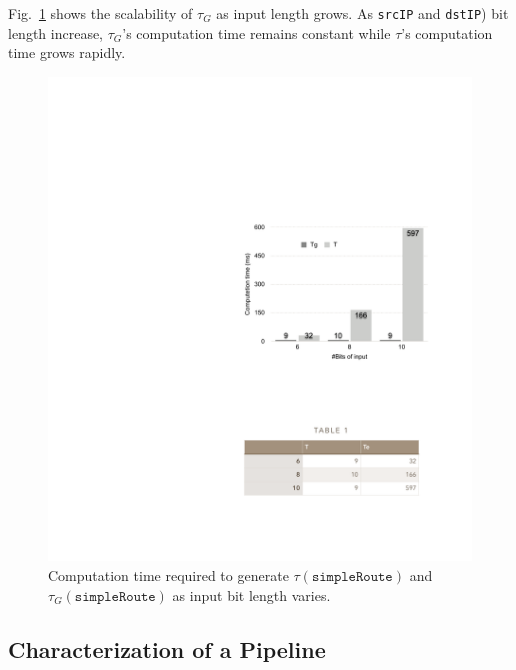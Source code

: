  Fig.~\ref{fig:e2-figure} shows the scalability of $\tau_G$ as input length grows. As \texttt{srcIP} and \texttt{dstIP}) bit length increase, $\tau_G$'s computation time remains constant while $\tau$'s computation time grows rapidly.



\begin{figure}[tbh]
    \centering
    \includegraphics[scale = 0.6]{figures/e2-figure.pdf}
\vspace{-3mm}
    \caption{Computation time required to generate $\tau(\texttt{simpleRoute})$ and $\tau_G(\texttt{simpleRoute})$ as input bit length varies.}
    \label{fig:e2-figure}
\end{figure}

\subsection{Characterization of a Pipeline}

